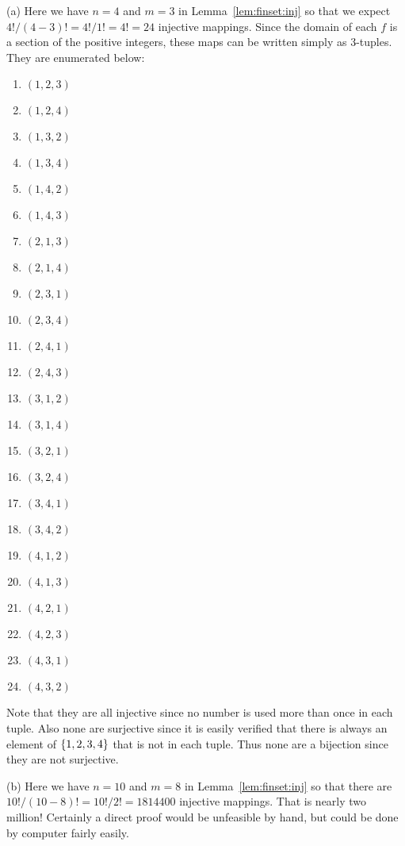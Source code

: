 {  \mainprob
  
  (a) Here we have $n=4$ and $m=3$ in Lemma~\ref{lem:finset:inj} so that we expect $4!/(4-3)! = 4!/1! = 4! = 24$ injective mappings.
  Since the domain of each $f$ is a section of the positive integers, these maps can be written simply as 3-tuples.
  They are enumerated below:
  \begin{multicols}{4}
    \begin{enumerate}[itemsep=0cm]
    \item $(1, 2, 3)$
    \item $(1, 2, 4)$
    \item $(1, 3, 2)$
    \item $(1, 3, 4)$
    \item $(1, 4, 2)$
    \item $(1, 4, 3)$
    \item $(2, 1, 3)$
    \item $(2, 1, 4)$
    \item $(2, 3, 1)$
    \item $(2, 3, 4)$
    \item $(2, 4, 1)$
    \item $(2, 4, 3)$
    \item $(3, 1, 2)$
    \item $(3, 1, 4)$
    \item $(3, 2, 1)$
    \item $(3, 2, 4)$
    \item $(3, 4, 1)$
    \item $(3, 4, 2)$
    \item $(4, 1, 2)$
    \item $(4, 1, 3)$
    \item $(4, 2, 1)$
    \item $(4, 2, 3)$
    \item $(4, 3, 1)$
    \item $(4, 3, 2)$
    \end{enumerate}
  \end{multicols}
  Note that they are all injective since no number is used more than once in each tuple.
  Also none are surjective since it is easily verified that there is always an element of $\left\{ 1,2,3,4 \right\}$ that is not in each tuple.
  Thus none are a bijection since they are not surjective.

  (b) Here we have $n = 10$ and $m = 8$ in Lemma~\ref{lem:finset:inj} so that there are $10! / (10-8)! = 10! / 2! = 1814400$ injective mappings.
  That is nearly two million!
  Certainly a direct proof would be unfeasible by hand, but could be done by computer fairly easily.
}

